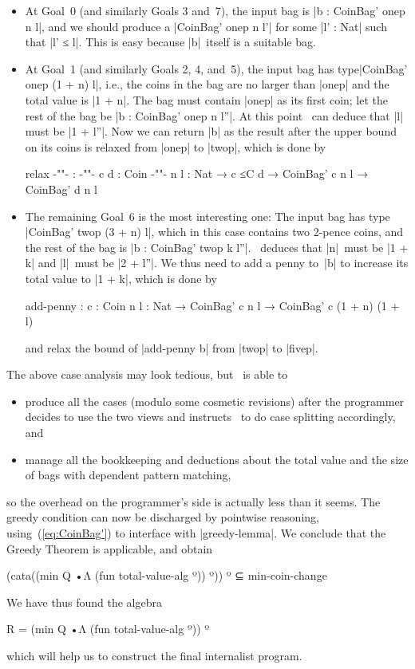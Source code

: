 \begin{itemize}
\item At Goal~0 (and similarly Goals 3 and~7), the input bag is |b : CoinBag' onep n l|, and we should produce a |CoinBag' onep n l'| for some |l' : Nat| such that |l' ≤ l|.
This is easy because |b|~itself is a suitable bag.
\item At Goal~1 (and similarly Goals 2, 4, and~5), the input bag has type\break |CoinBag' onep (1 + n) l|, i.e., the coins in the bag are no larger than |onep| and the total value is |1 + n|.
The bag must contain |onep| as its first coin; let the rest of the bag be |b : CoinBag' onep n l''|.
At this point \Agda\ can deduce that |l| must be |1 + l''|.
Now we can return |b| as the result after the upper bound on its coins is relaxed from |onep| to |twop|, which is done by
\begin{code}
relax {-"\kern-1.5pt"-} : {-"\kern-1.5pt"-} {c d : Coin} {-"\kern-1.5pt"-} {n l : Nat} → c ≤C d → CoinBag' c n l → CoinBag' d n l
\end{code}
\item The remaining Goal~6 is the most interesting one:
The input bag has type |CoinBag' twop (3 + n) l|, which in this case contains two 2-pence coins, and the rest of the bag is |b : CoinBag' twop k l''|.
\Agda\ deduces that |n|~must be |1 + k| and |l|~must be |2 + l''|.
We thus need to add a penny to~|b| to increase its total value to |1 + k|, which is done by
\begin{code}
add-penny :
  {c : Coin} {n l : Nat} → CoinBag' c n l → CoinBag' c (1 + n) (1 + l)
\end{code}
and relax the bound of |add-penny b| from |twop| to |fivep|.
\end{itemize}
The above case analysis may look tedious, but \Agda\ is able to
\begin{itemize}
\item produce all the cases (modulo some cosmetic revisions) after the programmer decides to use the two views and instructs \Agda\ to do case splitting accordingly, and
\item manage all the bookkeeping and deductions about the total value and the size of bags with dependent pattern matching,
\end{itemize}
so the overhead on the programmer's side is actually less than it seems.
The greedy condition can now be discharged by pointwise reasoning, using~(\ref{eq:CoinBag'}) to interface with |greedy-lemma|.
We conclude that the Greedy Theorem is applicable, and obtain
\begin{code}
(cata((min Q •Λ (fun total-value-alg º)) º)) º ⊆ min-coin-change
\end{code}
We have thus found the algebra
\begin{code}
R = (min Q •Λ (fun total-value-alg º)) º
\end{code}
which will help us to construct the final internalist program.

